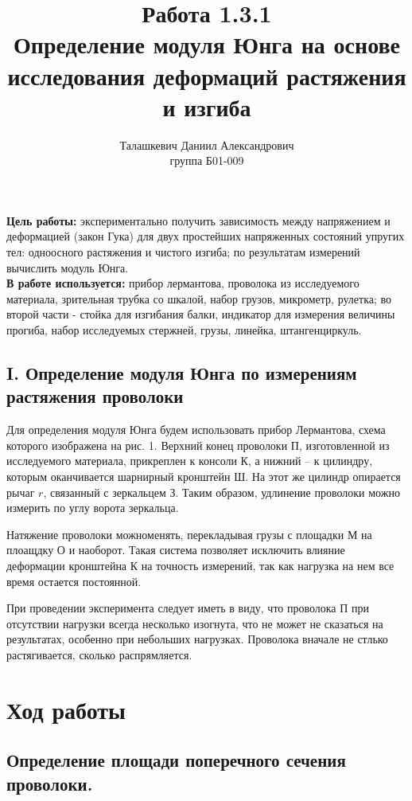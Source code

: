 \documentclass[a4paper, 12pt]{article}%
\author{Талашкевич Даниил Александрович \\
группа Б01-009}
\title{Работа 1.3.1 \\
Определение модуля Юнга на основе исследования деформаций растяжения и изгиба}
\begin{document}
\maketitle
\newpage
\textbf{Цель работы:} экспериментально получить зависимость между напряжением и деформацией (закон Гука) для двух простейших напряженных состояний упругих тел: одноосного растяжения и чистого изгиба; по результатам измерений вычислить модуль Юнга. \\
\textbf{В работе используется:} прибор лермантова, проволока из исследуемого материала, зрительная трубка со шкалой, набор грузов, микрометр, рулетка; во второй части - стойка для изгибания балки, индикатор для измерения величины прогиба, набор исследуемых стержней, грузы, линейка, штангенциркуль.
\begin{center}
{\section{I. Определение модуля Юнга по измерениям растяжения проволоки}}
\end{center}

Для определения модуля Юнга будем использовать прибор Лермантова, схема которого изображена на рис. 1. Верхний конец проволоки П, изготовленной из исследуемого материала, прикреплен к консоли К, а нижний -- к цилиндру, которым оканчивается шарнирный кронштейн Ш. На этот же цилиндр опирается рычаг $r$, связанный с зеркальцем З. Таким образом, удлинение проволоки можно измерить по углу ворота зеркальца.

Натяжение проволоки можноменять, перекладывая грузы с площадки М на плоащдку О и наоборот. Такая система позволяет исключить влияние деформации кронштейна К на точность измерений, так как нагрузка на нем все время остается постоянной.

При проведении эксперимента следует иметь в виду, что проволока П при отсутствии нагрузки всегда несколько изогнута, что не может не сказаться на результатах, особенно при небольших нагрузках. Проволока вначале не стлько растягивается, сколько распрямляется.


\section{Ход работы}


\subsection{Определение площади поперечного сечения проволоки.}
\end{document}
